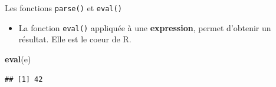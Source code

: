 \documentclass[
  ignorenonframetext,
]{beamer}
\newenvironment{Shaded}{\begin{snugshade}}{\end{snugshade}}
\newcommand{\FunctionTok}[1]{\textcolor[rgb]{0.13,0.29,0.53}{\textbf{#1}}}
\newcommand{\NormalTok}[1]{#1}
\providecommand{\tightlist}{%
  \setlength{\itemsep}{0pt}\setlength{\parskip}{0pt}}
\begin{document}
\begin{frame}[fragile]{Les fonctions \texttt{parse()} et
\texttt{eval()}}
\normalsize

\begin{itemize}
\tightlist
\item
  La fonction \texttt{eval()} appliquée à une \textbf{expression},
  permet d'obtenir un résultat. Elle est le coeur de R.
\end{itemize}

\tiny

\begin{Shaded}
\begin{Highlighting}[]
\FunctionTok{eval}\NormalTok{(e)}
\end{Highlighting}
\end{Shaded}

\begin{verbatim}
## [1] 42
\end{verbatim}

\normalsize
\end{frame}
\end{document}
